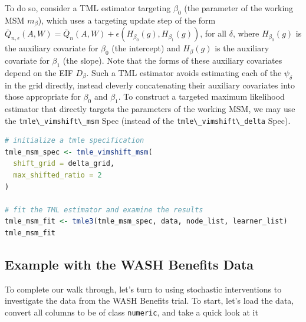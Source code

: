 \documentclass[
  12pt, krantz2,
]{krantz}
\newcommand{\passthrough}[1]{#1}
\newcommand{\1}{\mathbbm{1}}
\theoremstyle{definition}
\theoremstyle{definition}
\theoremstyle{definition}
\theoremstyle{definition}
\theoremstyle{remark}
\begin{document}
To do so, consider a TML estimator targeting \(\beta_0\) (the parameter of the
working MSM \(m_{\beta}\)), which uses a targeting update step of the form
\(\overline{Q}_{n, \epsilon}(A,W) = \overline{Q}_n(A,W) + \epsilon (H_{\beta_0}(g), H_{\beta_1}(g))\), for all \(\delta\), where \(H_{\beta_0}(g)\) is
the auxiliary covariate for \(\beta_0\) (the intercept) and \(H_{\beta}(g)\) is the
auxiliary covariate for \(\beta_1\) (the slope). Note that the forms of these
auxiliary covariates depend on the EIF \(D_{\beta}\). Such a TML estimator avoids
estimating each of the \(\psi_{\delta}\) in the grid directly, instead cleverly
concatenating their auxiliary covariates into those appropriate for \(\beta_0\)
and \(\beta_1\). To construct a targeted maximum likelihood estimator that
directly targets the parameters of the working MSM, we may use the
\passthrough{\lstinline!tmle\_vimshift\_msm!} Spec (instead of the \passthrough{\lstinline!tmle\_vimshift\_delta!} Spec).

\begin{lstlisting}[language=R]
# initialize a tmle specification
tmle_msm_spec <- tmle_vimshift_msm(
  shift_grid = delta_grid,
  max_shifted_ratio = 2
)

# fit the TML estimator and examine the results
tmle_msm_fit <- tmle3(tmle_msm_spec, data, node_list, learner_list)
tmle_msm_fit
\end{lstlisting}

\hypertarget{example-with-the-wash-benefits-data}{%
\subsection{Example with the WASH Benefits Data}\label{example-with-the-wash-benefits-data}}

To complete our walk through, let's turn to using stochastic interventions to
investigate the data from the WASH Benefits trial. To start, let's load the
data, convert all columns to be of class \passthrough{\lstinline!numeric!}, and take a quick look at it
\end{document}
